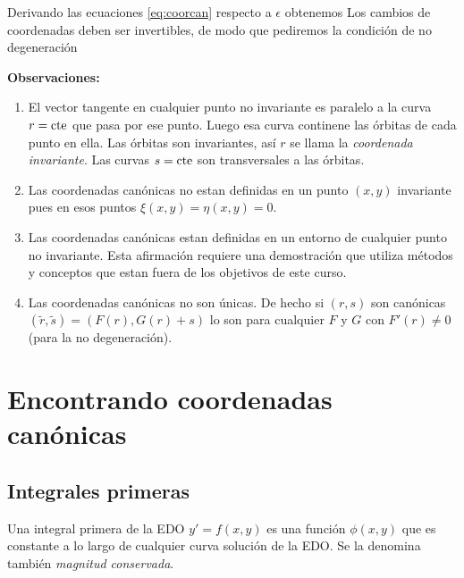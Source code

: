 Derivando las ecuaciones \eqref{eq:coorcan} respecto a $\epsilon$ obtenemos
 Los cambios de coordenadas deben ser invertibles, de modo que pediremos la condición de no degeneración





\noindent\textbf{Observaciones:}
\begin{enumerate}
\item El vector tangente en cualquier punto no invariante es paralelo a la curva $r=\hbox{cte}$ que pasa por ese punto. Luego esa curva continene las órbitas de cada punto en ella. Las órbitas son invariantes, así  $r$ se llama la \emph{coordenada invariante}. Las curvas $s=\hbox{cte}$ son transversales a las órbitas.
\item Las coordenadas canónicas no estan definidas en un punto $(x,y)$ invariante pues en esos puntos $\xi(x,y)=\eta(x,y)=0$.

\item Las coordenadas canónicas estan definidas en un entorno de cualquier   punto no invariante. Esta afirmación requiere una demostración que utiliza métodos y conceptos que estan fuera de los objetivos de este curso.

\item Las coordenadas canónicas no son únicas. De hecho si $(r,s)$ son canónicas $(\tilde{r},\tilde{s})=(F(r),G(r)+s)$ lo son para cualquier $F$ y $G$ con $F'(r)\neq 0$ (para la no degeneración).

\end{enumerate}






\section{Encontrando coordenadas canónicas}

 \subsection{Integrales primeras}
\begin{definicion} Una integral primera de la EDO $y'=f(x,y)$ es una función $\phi(x,y)$ que es constante a lo largo de cualquier curva solución de la EDO. Se la denomina también \emph{magnitud conservada}.
 \end{definicion}



